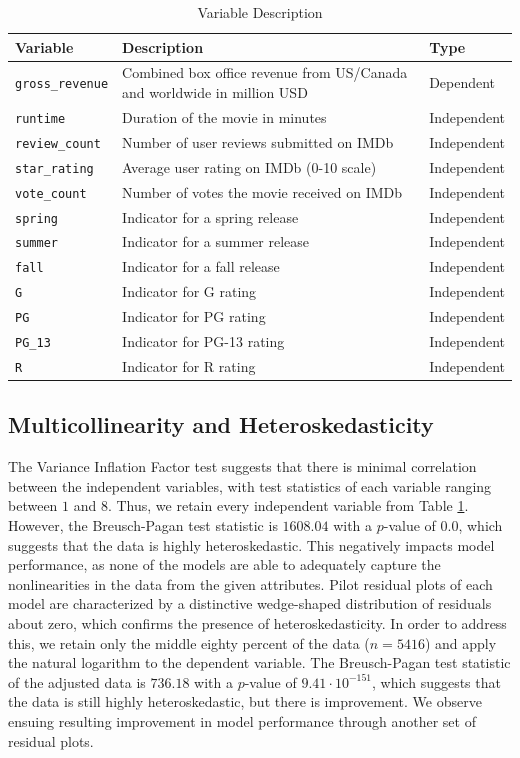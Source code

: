 \documentclass{article}
\begin{document}
\begin{table}[ht]
    \centering
    \caption{Variable Description}
    \begin{tabular}{l>{\raggedright}p{7cm}l}
        \toprule
        \textbf{Variable} & \textbf{Description} & \textbf{Type} \\
        \midrule
        \texttt{gross\_revenue} & Combined box office revenue from US/Canada and worldwide in million USD & Dependent \\
        \texttt{runtime} & Duration of the movie in minutes & Independent \\
        \texttt{review\_count} & Number of user reviews submitted on IMDb & Independent \\
        \texttt{star\_rating} & Average user rating on IMDb (0-10 scale) & Independent \\
        \texttt{vote\_count} & Number of votes the movie received on IMDb & Independent \\
        \texttt{spring} & Indicator for a spring release & Independent \\
        \texttt{summer} & Indicator for a summer release & Independent \\
        \texttt{fall} & Indicator for a fall release & Independent \\
        \texttt{G} & Indicator for G rating & Independent \\
        \texttt{PG} & Indicator for PG rating & Independent \\
        \texttt{PG\_13} & Indicator for PG-13 rating & Independent \\
        \texttt{R} & Indicator for R rating & Independent \\
        \bottomrule
    \end{tabular}
    \label{tab:var_desc}
\end{table}

\subsection{Multicollinearity and Heteroskedasticity}
The Variance Inflation Factor test suggests that there is minimal correlation between the independent variables, with test statistics of each variable ranging between $1$ and $8$. Thus, we retain every independent variable from Table \ref{tab:var_desc}. However, the Breusch-Pagan test statistic is $1608.04$ with a $p$-value of $0.0$, which suggests that the data is highly heteroskedastic. This negatively impacts model performance, as none of the models are able to adequately capture the nonlinearities in the data from the given attributes. Pilot residual plots of each model are characterized by a distinctive wedge-shaped distribution of residuals about zero, which confirms the presence of heteroskedasticity. In order to address this, we retain only the middle eighty percent of the data ($n=5416$) and apply the natural logarithm to the dependent variable. The Breusch-Pagan test statistic of the adjusted data is $736.18$ with a $p$-value of $9.41\cdot 10^{-151}$, which suggests that the data is still highly heteroskedastic, but there is improvement. We observe ensuing resulting improvement in model performance through another set of residual plots. 
\end{document}
